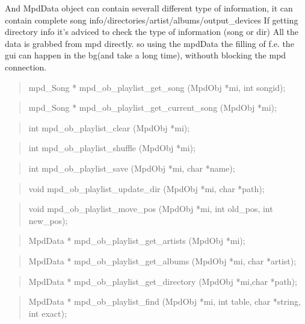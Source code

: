 \documentclass[a4paper,11pt]{article}
\begin{document}
And MpdData object can contain severall different type of information, it can contain complete song info/directories/artist/albums/output\_devices
If getting directory info it's adviced to check the type of information (song or dir)
All the data is grabbed from mpd directly.  so using the mpdData the filling of f.e. the gui can happen in the bg(and take a long time), withouth blocking the mpd connection.

\begin{quote}
mpd\_Song *  mpd\_ob\_playlist\_get\_song  (MpdObj *mi, int songid);
\end{quote}

\begin{quote}
mpd\_Song *  mpd\_ob\_playlist\_get\_current\_song (MpdObj *mi);
\end{quote}

\begin{quote}
int   mpd\_ob\_playlist\_clear   (MpdObj *mi);
\end{quote}

\begin{quote}
int   mpd\_ob\_playlist\_shuffle   (MpdObj *mi);
\end{quote}

\begin{quote}
int   mpd\_ob\_playlist\_save   (MpdObj *mi, char *name);
\end{quote}

\begin{quote}
void   mpd\_ob\_playlist\_update\_dir  (MpdObj *mi, char *path);
\end{quote}

\begin{quote}
void   mpd\_ob\_playlist\_move\_pos  (MpdObj *mi, int old\_pos, int new\_pos);
\end{quote}

\begin{quote}
MpdData *  mpd\_ob\_playlist\_get\_artists  (MpdObj *mi);
\end{quote}

\begin{quote}
MpdData * mpd\_ob\_playlist\_get\_albums  (MpdObj *mi, char *artist);
\end{quote}

\begin{quote}
MpdData *  mpd\_ob\_playlist\_get\_directory  (MpdObj *mi,char *path);
\end{quote}

\begin{quote}
MpdData *  mpd\_ob\_playlist\_find   (MpdObj *mi, int table, char *string, int exact);
\end{quote}
\end{document}
